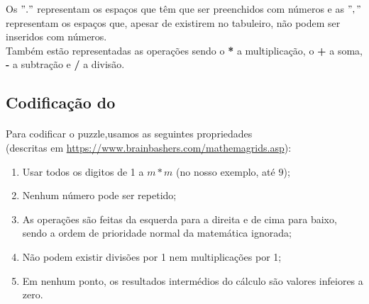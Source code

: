 \documentclass{article}
\begin{document}
Os $"."$ representam os espaços que têm que ser preenchidos com números e as $","$ representam os espaços que, apesar de existirem no tabuleiro, não podem ser inseridos com números. 
\\

Também estão representadas as operações sendo o {\bf{*}} a multiplicação, o  {\bf{+}} a soma, {\bf{-}} a subtração e {\bf{/}} a divisão. 




\subsection{Codificação do {}}
\paragraph{} Para codificar o puzzle,usamos as seguintes propriedades \\
(descritas em {\url{https://www.brainbashers.com/mathemagrids.asp}}):
 \begin{enumerate}
 \item Usar todos os digitos de 1 a $m*m$ (no nosso exemplo, até $9$);
 \item Nenhum número pode ser repetido;
 \item As operações são feitas da esquerda para a direita e de cima para baixo, sendo a ordem de prioridade normal da matemática ignorada;
 \item Não podem existir divisões por 1 nem multiplicações por 1;
\item Em nenhum ponto, os resultados intermédios do cálculo são valores infeiores a zero.
 \end{enumerate}
\end{document}

